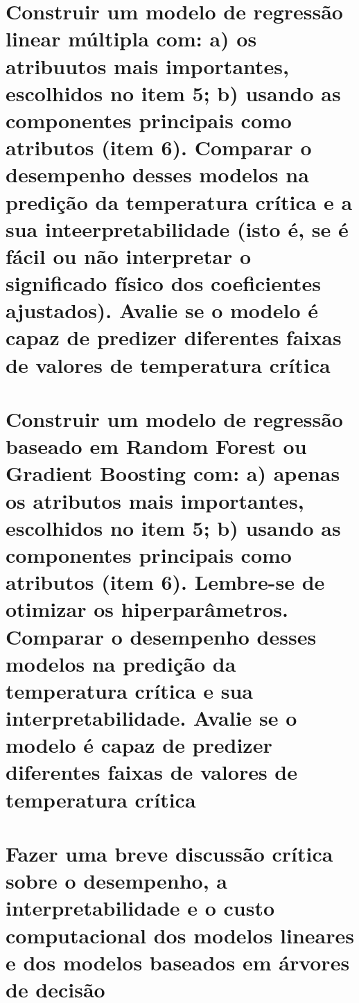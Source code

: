\documentclass{codeclass}
\begin{document}
    

\section{Construir um modelo de regressão linear múltipla com: a) os atribuutos mais importantes, escolhidos no item 5; b) usando as componentes principais como atributos (item 6). Comparar o desempenho desses modelos na predição da temperatura crítica e a sua inteerpretabilidade (isto é, se é fácil ou não interpretar o significado físico dos coeficientes ajustados). Avalie se o modelo é capaz de predizer diferentes faixas de valores de temperatura crítica}

    

\section{Construir um modelo de regressão baseado em Random Forest ou Gradient Boosting com: a) apenas os atributos mais importantes, escolhidos no item 5; b) usando as componentes principais como atributos (item 6). Lembre-se de otimizar os hiperparâmetros. Comparar o desempenho desses modelos na predição da temperatura crítica e sua interpretabilidade. Avalie se o modelo é capaz de predizer diferentes faixas de valores de temperatura crítica}

    

\section{Fazer uma breve discussão crítica sobre o desempenho, a interpretabilidade e o custo computacional dos modelos lineares e dos modelos baseados em árvores de decisão}

    
\end{document}
